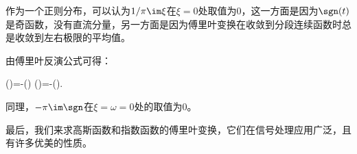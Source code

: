 作为一个正则分布，可以认为$1/\pi\im\xi$在$\xi=0$处取值为0，这一方面是因为$\sgn(t)$是奇函数，没有直流分量，另一方面是因为傅里叶变换在收敛到分段连续函数时总是收敛到左右极限的平均值。

由傅里叶反演公式可得：%
\begin{corollary}\label{cor:1/t}
    \begin{lralign}
        (\xi)=-\pi \im \sgn(\xi)
    \switch
        (\omega)=-\pi \im \sgn(\omega).
    \end{lralign}
\end{corollary}

同理，$-\pi\im\sgn$在$\xi=\omega=0$处的取值为0。

最后，我们来求高斯函数和指数函数的傅里叶变换，它们在信号处理应用广泛，且有许多优美的性质。

